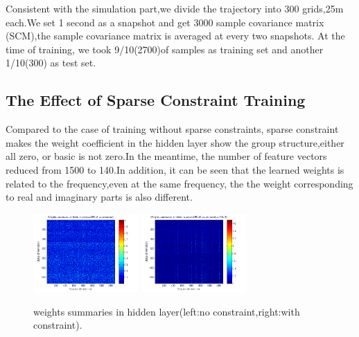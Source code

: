 Consistent with the simulation part,we divide the trajectory into 300 grids,25m each.We set 1 second as a snapshot and get 3000 sample covariance matrix (SCM),the sample covariance matrix is averaged at every two snapshots.
At the time of training, we took 9/10(2700)of samples as training set and another 1/10(300) as test set.

\subsection{The Effect of Sparse Constraint Training}
Compared to the case of training without sparse constraints, sparse constraint makes the weight coefficient in the hidden layer show the group structure,either all zero, or basic is not zero.In the meantime, the number of feature vectors reduced from 1500 to 140.In addition, it can be seen that the learned weights is related to the frequency,even at the same frequency, the the weight corresponding to real and imaginary parts is also different.

\begin{figure}
\includegraphics[width=4cm,height=3cm]{figure/Weights_summaries_in_hidden_laye_swell_exp}
\includegraphics[width=4cm,height=3cm]{figure/Weights_summaries_in_hidden_laye_swell_exp_sc_3dot5_e_neg_5}
\caption{weights summaries in hidden layer(left:no constraint,right:with constraint).}
\end{figure}




